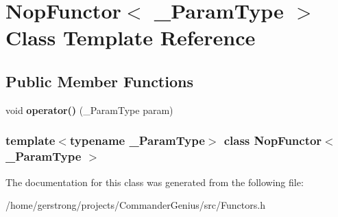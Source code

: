 \hypertarget{class_nop_functor}{
\section{NopFunctor$<$ \_\-ParamType $>$ Class Template Reference}
\label{class_nop_functor}
}
\subsection*{Public Member Functions}
\begin{DoxyCompactItemize}
\item 
\hypertarget{class_nop_functor_afc48d5f43c2ec8e5203d9ef173b28497}{
void {\bfseries operator()} (\_\-ParamType param)}
\label{class_nop_functor_afc48d5f43c2ec8e5203d9ef173b28497}

\end{DoxyCompactItemize}
\subsubsection*{template$<$typename \_\-ParamType$>$ class NopFunctor$<$ \_\-ParamType $>$}



The documentation for this class was generated from the following file:\begin{DoxyCompactItemize}
\item 
/home/gerstrong/projects/CommanderGenius/src/Functors.h\end{DoxyCompactItemize}
